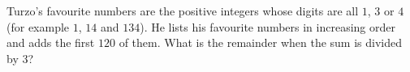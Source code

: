 Turzo's favourite numbers are the positive integers whose digits are all $1$, $3$ or $4$ (for example $1$, $14$ and $134$). He lists his favourite numbers in increasing order and adds the first $120$ of them. What is the remainder when the sum is divided by $3$?
